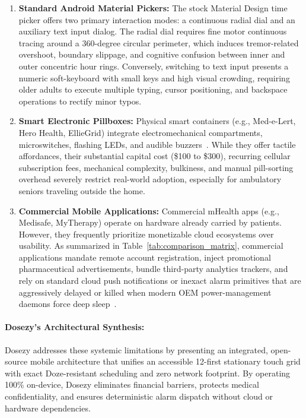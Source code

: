 \documentclass[11pt,a4paper]{article}
\begin{document}
\begin{enumerate}[leftmargin=*]
    \item \textbf{Standard Android Material Pickers:} The stock Material Design time picker offers two primary interaction modes: a continuous radial dial and an auxiliary text input dialog. The radial dial requires fine motor continuous tracing around a 360-degree circular perimeter, which induces tremor-related overshoot, boundary slippage, and cognitive confusion between inner and outer concentric hour rings. Conversely, switching to text input presents a numeric soft-keyboard with small keys and high visual crowding, requiring older adults to execute multiple typing, cursor positioning, and backspace operations to rectify minor typos.
    \item \textbf{Smart Electronic Pillboxes:} Physical smart containers (e.g., Med-e-Lert, Hero Health, EllieGrid) integrate electromechanical compartments, microswitches, flashing LEDs, and audible buzzers~\cite{dayer2013smartphone}. While they offer tactile affordances, their substantial capital cost (\$100 to \$300), recurring cellular subscription fees, mechanical complexity, bulkiness, and manual pill-sorting overhead severely restrict real-world adoption, especially for ambulatory seniors traveling outside the home.
    \item \textbf{Commercial Mobile Applications:} Commercial mHealth apps (e.g., Medisafe, MyTherapy) operate on hardware already carried by patients. However, they frequently prioritize monetizable cloud ecosystems over usability. As summarized in Table~\ref{tab:comparison_matrix}, commercial applications mandate remote account registration, inject promotional pharmaceutical advertisements, bundle third-party analytics trackers, and rely on standard cloud push notifications or inexact alarm primitives that are aggressively delayed or killed when modern OEM power-management daemons force deep sleep~\cite{wildenbos2018aging,aosp2024offline}.
\end{enumerate}

\paragraph{Dosezy's Architectural Synthesis:} Dosezy addresses these systemic limitations by presenting an integrated, open-source mobile architecture that unifies an accessible 12-first stationary touch grid with exact Doze-resistant scheduling and zero network footprint. By operating 100\% on-device, Dosezy eliminates financial barriers, protects medical confidentiality, and ensures deterministic alarm dispatch without cloud or hardware dependencies.
\end{document}
